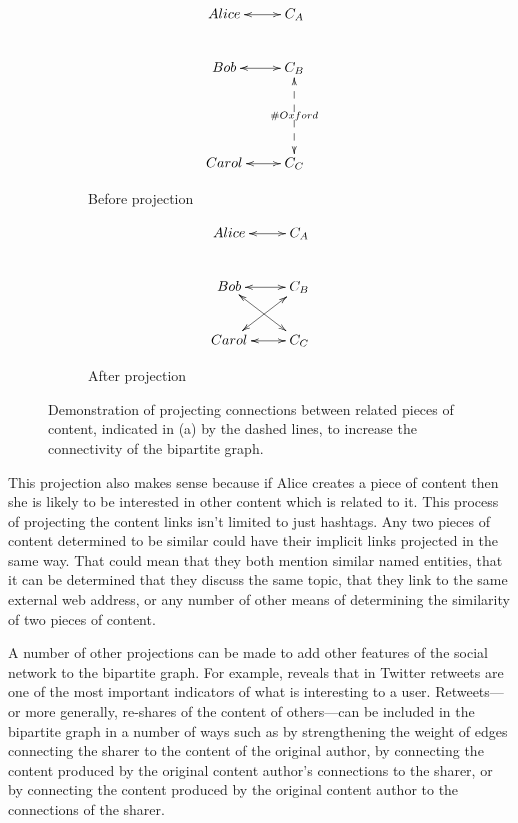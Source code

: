 \begin{figure}
  \centering
  \begin{subfigure}[b]{0.3\textwidth}
    \centering
    \begin{displaymath}
    \xymatrix{
    Alice \ar@{<->}[r]  & C_{A}   \\
    Bob \ar@{<->}[r]    & C_{B}   \\
     & \\
    Carol  \ar@{<->}[r] & C_{C} \ar@{<-->}[uu]|{\#Oxford}  }
    \end{displaymath}
    \caption{Before projection}
    \label{fig:before_content_projection}

  \end{subfigure}
  \quad
  \begin{subfigure}[b]{0.3\textwidth}
    \centering
    \begin{displaymath}
    \xymatrix{
    Alice \ar@{<->}[r]  & C_{A}   \\
    Bob \ar@{<->}[r]    & C_{B}  \ar@{<->}[dl] \\
    Carol \ar@{<->}[r] & C_{C} \ar@{<->}[ul]  }
    \end{displaymath}
    \caption{After projection}
    \label{fig:after_content_projection} 
  \end{subfigure}
  \caption[Projecting content connections into the bipartite graph]{ Demonstration of projecting connections between related pieces of content, indicated in (a) by the dashed lines, to increase the connectivity of the bipartite graph. }
  \label{fig:content_projection}
\end{figure}

This projection also makes sense because if Alice creates a piece of content then she is likely to be interested in other content which is related to it. This process of projecting the content links isn't limited to just hashtags. Any two pieces of content determined to be similar could have their implicit links projected in the same way. That could mean that they both mention similar named entities, that it can be determined that they discuss the same topic, that they link to the same external web address, or any number of other means of determining the similarity of two pieces of content.

A number of other projections can be made to add other features of the social network to the bipartite graph. For example, \cite{Welch2011} reveals that in Twitter retweets are one of the most important indicators of what is interesting to a user. Retweets---or more generally, re-shares of the content of others---can be included in the bipartite graph in a number of ways such as by strengthening the weight of edges connecting the sharer to the content of the original author, by connecting the content produced by the original content author's connections to the sharer, or by connecting the content produced by the original content author to the connections of the sharer.

